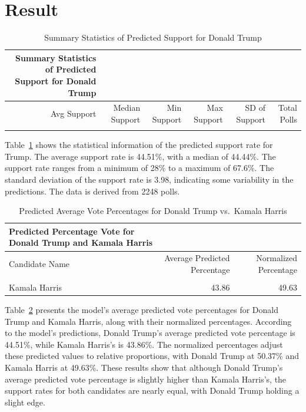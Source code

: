 \documentclass[
  letterpaper,
  DIV=11,
  numbers=noendperiod]{scrartcl}
\begin{document}
\hypertarget{sec-results}{%
\section{Result}\label{sec-results}}

\hypertarget{tbl-trump}{}
\begin{longtable}[t]{rrrrrr}
\caption{\label{tbl-trump}Summary Statistics of Predicted Support for Donald Trump }Summary Statistics of Predicted Support for Donald Trump}\\
\toprule
Avg Support & Median Support & Min Support & Max Support & SD of Support & Total Polls\\
\midrule
\cellcolor{gray!10}{44.51} & \cellcolor{gray!10}{44.44} & \cellcolor{gray!10}{28} & \cellcolor{gray!10}{67.6} & \cellcolor{gray!10}{3.98} & \cellcolor{gray!10}{2248}\\
\bottomrule
\end{longtable}

Table~\ref{tbl-trump} shows the statistical information of the predicted
support rate for Trump. The average support rate is 44.51\%, with a
median of 44.44\%. The support rate ranges from a minimum of 28\% to a
maximum of 67.6\%. The standard deviation of the support rate is 3.98,
indicating some variability in the predictions. The data is derived from
2248 polls.

\hypertarget{tbl-modelresults}{}
\begin{longtable}[t]{lrr}
\caption{\label{tbl-modelresults}Predicted Average Vote Percentages for Donald Trump vs.~Kamala Harris }Predicted Percentage Vote for Donald Trump and Kamala Harris}\\
\toprule
Candidate Name & Average Predicted Percentage & Normalized Percentage\\
\midrule
\cellcolor{gray!10}{Donald Trump} & \cellcolor{gray!10}{44.51} & \cellcolor{gray!10}{50.37}\\
Kamala Harris & 43.86 & 49.63\\
\bottomrule
\end{longtable}

Table~\ref{tbl-modelresults} presents the model's average predicted vote
percentages for Donald Trump and Kamala Harris, along with their
normalized percentages. According to the model's predictions, Donald
Trump's average predicted vote percentage is 44.51\%, while Kamala
Harris's is 43.86\%. The normalized percentages adjust these predicted
values to relative proportions, with Donald Trump at 50.37\% and Kamala
Harris at 49.63\%. These results show that although Donald Trump's
average predicted vote percentage is slightly higher than Kamala
Harris's, the support rates for both candidates are nearly equal, with
Donald Trump holding a slight edge.
\end{document}
